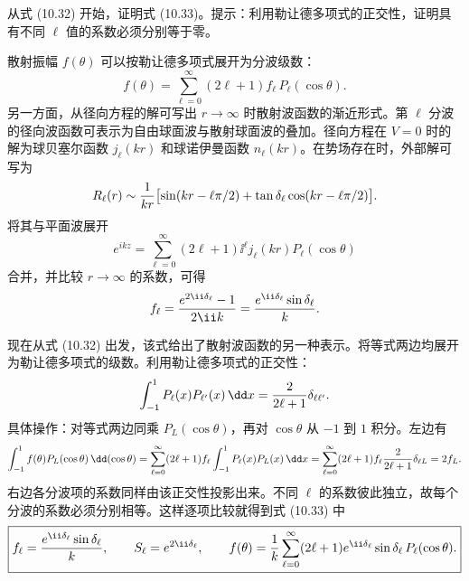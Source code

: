 \begin{question}
从式 (10.32) 开始，证明式 (10.33)。提示：利用勒让德多项式的正交性，证明具有不同 $\ell$ 值的系数必须分别等于零。

\par\smallskip
{}

\end{question}
\begin{solution}
散射振幅 $f(\theta)$ 可以按勒让德多项式展开为分波级数：
\[
f(\theta)=\sum_{\ell=0}^{\infty}(2\ell+1)f_\ell\,P_\ell(\cos\theta).
\]
另一方面，从径向方程的解可写出 $r\to\infty$ 时散射波函数的渐近形式。第 $\ell$ 分波的径向波函数可表示为自由球面波与散射球面波的叠加。径向方程在 $V=0$ 时的解为球贝塞尔函数 $j_\ell(kr)$ 和球诺伊曼函数 $n_\ell(kr)$。在势场存在时，外部解可写为
\[
R_\ell(r)\sim {1\over kr}\bigl[\sin(kr-\ell\pi/2)+\tan\delta_\ell\cos(kr-\ell\pi/2)\bigr].
\]
将其与平面波展开
\[
e^{ikz}=\sum_{\ell=0}^{\infty}(2\ell+1)\ii^\ell j_\ell(kr)P_\ell(\cos\theta)
\]
合并，并比较 $r\to\infty$ 的系数，可得
\[
f_\ell={e^{2\ii\delta_\ell}-1\over2\ii k}={e^{\ii\delta_\ell}\sin\delta_\ell\over k}.
\]

现在从式 (10.32) 出发，该式给出了散射波函数的另一种表示。将等式两边均展开为勒让德多项式的级数。利用勒让德多项式的正交性：
\[
\int_{-1}^{1}P_\ell(x)P_{\ell'}(x)\,\dd x={2\over2\ell+1}\delta_{\ell\ell'}.
\]
具体操作：对等式两边同乘 $P_L(\cos\theta)$，再对 $\cos\theta$ 从 $-1$ 到 $1$ 积分。左边有
\[
\int_{-1}^1 f(\theta)P_L(\cos\theta)\,\dd(\cos\theta)
=\sum_{\ell=0}^\infty(2\ell+1)f_\ell\int_{-1}^1 P_\ell(x)P_L(x)\,\dd x
=\sum_{\ell=0}^\infty(2\ell+1)f_\ell{2\over2\ell+1}\delta_{\ell L}=2f_L.
\]
右边各分波项的系数同样由该正交性投影出来。不同 $\ell$ 的系数彼此独立，故每个分波的系数必须分别相等。这样逐项比较就得到式 (10.33) 中
\[
\boxed{f_\ell={e^{\ii\delta_\ell}\sin\delta_\ell\over k},\qquad S_\ell=e^{2\ii\delta_\ell},\qquad f(\theta)={1\over k}\sum_{\ell=0}^\infty(2\ell+1)e^{\ii\delta_\ell}\sin\delta_\ell\,P_\ell(\cos\theta).}
\]
\end{solution}

